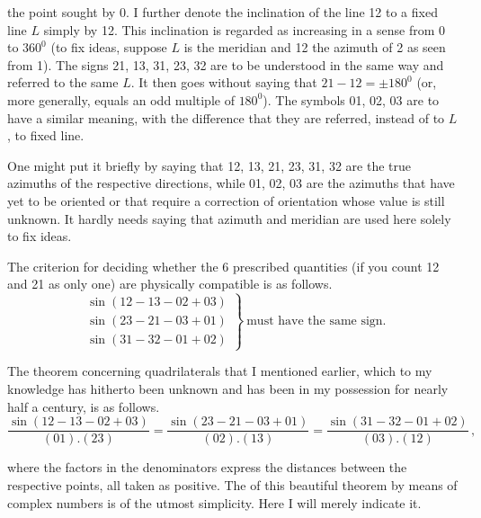 the point sought by 0. I further denote the inclination of the line 12 to a fixed line $L$ simply by 12. This inclination is regarded as increasing in a  sense from 0 to $360^0$ (to fix ideas, suppose $L$ is the meridian and 12 the azimuth of 2 as seen from 1). The signs 21, 13, 31, 23, 32 are to be understood in the same way and referred to the same $L$. It then goes without saying that $21-12=\pm180^0$ (or, more generally, equals an odd multiple of $180^0$). The symbols 01, 02, 03 are to have a similar meaning, with the difference that they are referred, instead of to $L$, to  fixed line.

One might put it briefly by saying that 12, 13, 21, 23, 31, 32 are the true azimuths of the respective directions, while 01, 02, 03 are the azimuths that have yet to be oriented or that require a correction of orientation whose value is still unknown. It hardly needs saying that azimuth and meridian are used here solely to fix ideas.

The criterion for deciding whether the 6 prescribed quantities (if you count 12 and 21 as only one) are physically compatible is as follows.
\[
\left.
\begin{array}{l}
\sin(12-13-02+03)\\
\sin(23-21-03+01)\\
\sin(31-32-01+02)
\end{array}
\right\}\ \text{must have the same sign.}
\]

The theorem concerning quadrilaterals that I mentioned earlier, which to my knowledge has hitherto been unknown and has been in my possession for nearly half a century, is as follows.
\[
\frac{\sin(12-13-02+03)}{(01).(23)}=\frac{\sin(23-21-03+01)}{(02).(13)}=\frac{\sin(31-32-01+02)}{(03).(12)}\,,
\]

where the factors in the denominators express the distances between the respective points, all taken as positive. The  of this beautiful theorem by means of complex numbers is of the utmost simplicity. Here I will merely indicate it.



